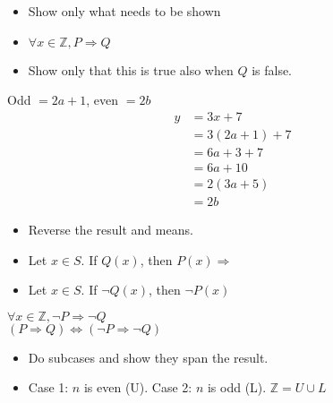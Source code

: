 \documentclass[english,10pt,a4paper]{article}
\begin{document}
\begin{theo} 
\begin{minipage}{0.7\linewidth}
\begin{itemize}
\item Show only what needs to be shown
\item $\forall x \in \mathbb{Z}, P \Rightarrow Q$
\item[] Show only that this is true also when $Q$ is false.
\end{itemize}
\end{minipage}
\hspace{0.1cm}
\begin{minipage}{0.25\linewidth}
Odd $= 2a+1$, even $=2b$
\begin{align*}
y	&=3x+7\\
	&=3(2a+1)+7\\
	&=6a+3+7\\
	&=6a+10\\
	&=2(3a+5)\\
	&=2b
\end{align*}
\end{minipage}
\end{theo}



\begin{theo} 
\begin{minipage}{0.65\linewidth}
\begin{itemize}
\item Reverse the result and means.
\item Let $x \in S$. If $Q(x)$, then $P(x) \Rightarrow$
\item[] Let $x \in S$. If $\neg Q(x)$, then $\neg P(x)$
\end{itemize}
\end{minipage}
\hspace{0.1cm}
\begin{minipage}{0.3\linewidth}
$\forall x \in \mathbb{Z}, \neg P \Rightarrow \neg Q$\\
$(P \Rightarrow Q) \Leftrightarrow (\neg P \Rightarrow \neg
Q)$
\end{minipage}
\end{theo}



\begin{theo} 
\begin{itemize}
\item Do subcases and show they span the result.
\item Case 1: $n$ is even (U). Case 2: $n$ is odd (L). $\mathbb{Z} = U \cup L $
\end{itemize}
\end{theo}
\end{document}
